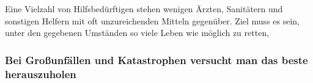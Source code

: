 
Eine Vielzahl von Hilfsbedürftigen stehen wenigen \"Arzten,
Sanitätern und sonstigen Helfern mit oft unzureichenden Mitteln
gegenüber. Ziel muss es sein, unter den gegebenen Umständen so
viele Leben wie möglich zu retten, 

\subsubsection{Bei Gro{\ss}unfällen und Katastrophen versucht man das beste
herauszuholen}


